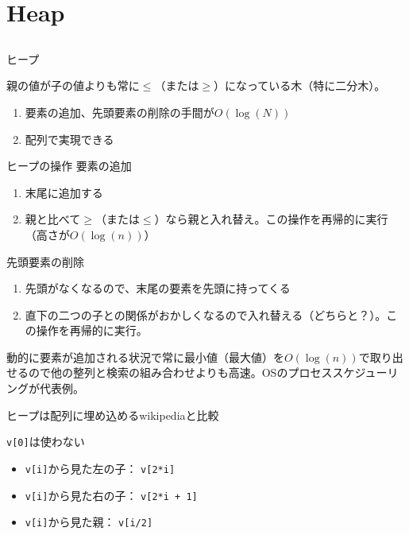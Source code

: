 \documentclass{beamer}
\begin{document}
\section{Heap}		%
\subsection{}

\begin{frame}[fragile]{ヒープ}{}

親の値が子の値よりも常に$\le$（または$\ge$）になっている木（特に二分木）。

\begin{enumerate}\itemsep8pt
\item 要素の追加、先頭要素の削除の手間が$O(\log(N))$
\item 配列で実現できる
\end{enumerate}
\end{frame}


\begin{frame}[fragile]{ヒープの操作}{}
要素の追加

\begin{enumerate}%
\item 末尾に追加する
\item 親と比べて$\ge$（または$\le$）なら親と入れ替え。この操作を再帰的に実行（高さが$O(\log(n))$）
\end{enumerate}
\vfill
先頭要素の削除
\begin{enumerate}%
\item 先頭がなくなるので、末尾の要素を先頭に持ってくる
\item 直下の二つの子との関係がおかしくなるので入れ替える（どちらと？）。この操作を再帰的に実行。
\end{enumerate}

\vfill
動的に要素が追加される状況で常に最小値（最大値）を$O(\log(n))$で取り出せるので他の整列と検索の組み合わせよりも高速。OSのプロセススケジューリングが代表例。
\end{frame}

\begin{frame}[fragile]{ヒープは配列に埋め込める}{wikipediaと比較}

\begin{center}
\end{center}
\texttt{v[0]}は使わない

\vfill
\begin{itemize}%
\item \texttt{v[i]}から見た左の子： \texttt{v[2*i]}
\item \texttt{v[i]}から見た右の子： \texttt{v[2*i + 1]}
\item \texttt{v[i]}から見た親： \texttt{v[i/2]}
\end{itemize}
\end{frame}
\end{document}
